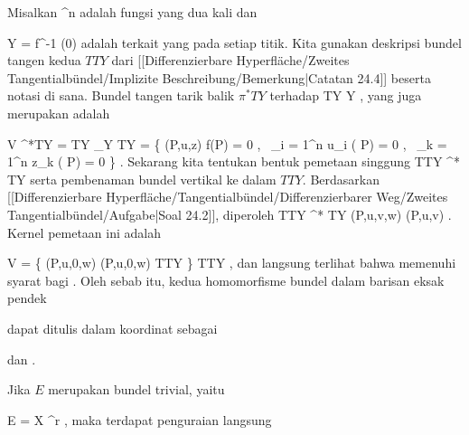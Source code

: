 {}
{

Misalkan
 {\R^n } { \R
} {}
adalah fungsi yang dua kali
dan

\mavergleichskette
{\vergleichskette
{ Y
}
{ = }{ f^{-1} (0)
}
{  }{
}
{    }{
}
{   }{
}
}
{}{}{}
adalah
terkait yang
pada setiap titik. Kita gunakan deskripsi bundel tangen kedua $TTY$ dari
[[Differenzierbare Hyperfläche/Zweites Tangentialbündel/Implizite Beschreibung/Bemerkung|Catatan 24.4]]
beserta notasi di sana. Bundel tangen tarik balik $\pi^*TY$ terhadap
\maabbdisp {\pi} {TY} {Y
} {,}
yang juga merupakan
adalah

\mavergleichskettealign
{\vergleichskettealign
{ V
}
{ \cong} { \pi^*TY
}
{ =} { TY \times_Y TY
}
{ =} { \left\{ (P,u,z)  \mid  f(P) = 0 , \,  \sum_{i = 1}^n u_i {  } ( P) = 0   , \,  \sum_{k = 1}^n z_k {  } ( P) = 0    \right\}
}
{ } {
}
}
{}
{}{.}
Sekarang kita tentukan bentuk pemetaan singgung
 {TTY } { \pi^* TY
} {}
serta pembenaman bundel vertikal ke dalam $TTY$. Berdasarkan
[[Differenzierbare Hyperfläche/Tangentialbündel/Differenzierbarer Weg/Zweites Tangentialbündel/Aufgabe|Soal 24.2]],
diperoleh
 {TTY} { \pi^* TY
} {(P,u,v,w)} { (P,u,v)
} {.}
Kernel pemetaan ini adalah

\mavergleichskettedisp
{\vergleichskette
{ V
}
{ =} { \left\{  (P,u,0,w)   \mid   (P,u,0,w) \in TTY          \right\}
}
{ \subset} { TTY
}
{ } {
}
{ } {
}
}
{}{}{,}
dan langsung terlihat bahwa
 memenuhi syarat bagi
.
Oleh sebab itu, kedua homomorfisme bundel dalam barisan eksak pendek

 {  }

dapat ditulis dalam koordinat sebagai

 dan
.

}

Jika $E$ merupakan bundel trivial, yaitu

\mavergleichskette
{\vergleichskette
{ E
}
{ = }{ X \times \R^r
}
{  }{
}
{    }{
}
{   }{
}
}
{}{}{,}
maka terdapat penguraian langsung
 {} {}

